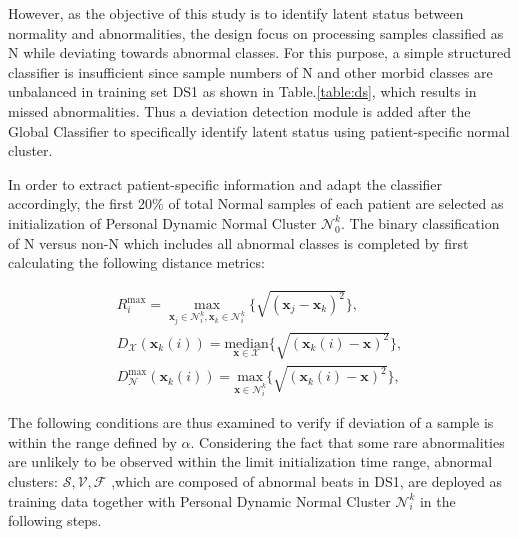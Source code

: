 However, as the objective of this study is to identify latent status between normality and abnormalities, the design focus on processing samples classified as N while deviating towards abnormal classes. For this purpose, a simple structured classifier is insufficient since sample numbers of N and other morbid classes are unbalanced in training set DS1 as shown in Table.\ref{table:ds}, which results in missed abnormalities. Thus a deviation detection module is added after the Global Classifier to specifically identify latent status using patient-specific normal cluster. 


In order to extract patient-specific information and adapt the classifier accordingly, the first 20\% of total Normal samples of each patient are selected as initialization of Personal Dynamic Normal Cluster $\mathcal{N}_0^k$. 
The binary classification of N versus non-N which includes all abnormal classes is completed by first calculating the following distance metrics:

\begin{align}
\label{eq:matrices}
R_i^{\max}=\underset{\mathbf{x}_j\in\mathcal{N}_i^k,\mathbf{x}_k\in\mathcal{N}_i^k}{\max}\{\sqrt{(\mathbf{x}_j-\mathbf{x}_k)^2}\},
\\
D_\mathcal{X}(\mathbf{x}_k(i))=\underset{\mathbf{x} \in\mathcal{X}}{\text{median}}\{\sqrt{(\mathbf{x}_k(i)-\mathbf{x})^2}\},
\\
D_\mathcal{N}^{\max}(\mathbf{x}_k(i))=\underset{\mathbf{x} \in\mathcal{N}_i^k}{\text{max}}\{\sqrt{(\mathbf{x}_k(i)-\mathbf{x})^2}\},
\end{align}

The following conditions are thus examined to verify if deviation of a sample is within the range defined by $\alpha$. Considering the fact that some rare abnormalities are unlikely to be observed within the limit initialization time range, abnormal clusters: ${\mathcal{S},\mathcal{V},\mathcal{F}}$ ,which are composed of abnormal beats in DS1, are deployed as training data together with Personal Dynamic Normal Cluster $\mathcal{N}_i^k$ in the following steps.

